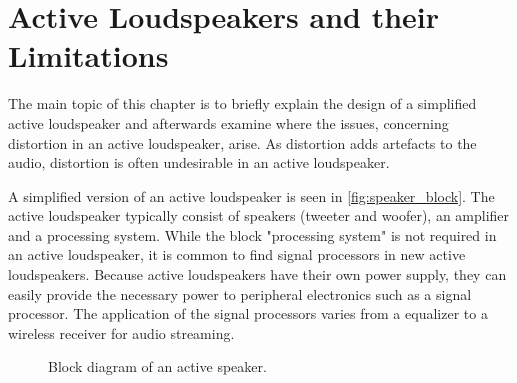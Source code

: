 


\chapter{Active Loudspeakers and their Limitations}
The main topic of this chapter is to briefly explain the design of a simplified active loudspeaker and afterwards examine where the issues, concerning distortion in an active loudspeaker, arise. As distortion adds artefacts to the audio, distortion is often undesirable in an active loudspeaker. 

A simplified version of an active loudspeaker is seen in \autoref{fig:speaker_block}. The active loudspeaker typically consist of speakers (tweeter and woofer), an amplifier and a processing system. While the block "processing system" is not required in an active loudspeaker, it is common to find signal processors in new active loudspeakers. Because active loudspeakers have their own power supply, they can easily provide the necessary power to peripheral electronics such as a signal processor. The application of the signal processors varies from a equalizer to a wireless receiver for audio streaming.

\begin{figure}[H]
\centering
{}
\scalebox{0.9}{
}
\caption{Block diagram of an active speaker.}
\label{fig:speaker_block}
\end{figure}


